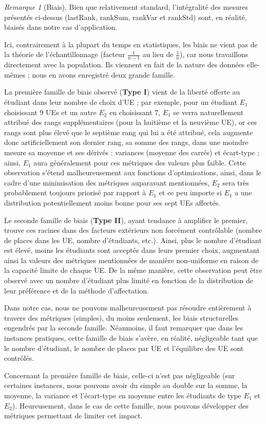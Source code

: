 \documentclass{rapport}
\theoremstyle{definition}
\theoremstyle{remark}
\theoremstyle{definition}
\theoremstyle{remark}
\newtheorem{remark}{Remarque}
\begin{document}
\begin{remark}[Biais]
    Bien que relativement standard, l'intégralité des mesures présentés ci-dessus (lastRank, rankSum, rankVar et rankStd) sont, en réalité, biaisés dans notre cas d'application.

    Ici, contrairement à la plupart du temps en statistiques, les biais ne vient pas de la théorie de l'échantillonnage (facteur $\frac{1}{n-1}$ au lieu de $\frac{1}{n}$), car nous travaillons directement avec la population. Ils viennent en fait de la nature des données elle-mêmes ; nous en avons enregistré deux grande famille.

    La première famille de biais observé (\textbf{Type I}) vient de la liberté offerte au étudiant dans leur nombre de choix d'UE ; par exemple, pour un étudiant $E_1$ choisissant 9 UEs et un autre $E_2$ en choisissant 7, $E_1$ se verra naturellement attribué des rangs supplémentaires (pour la huitième et la neuvième UE), or ces rangs sont plus élevé que le septième rang qui lui a été attribué, cela augmente donc artificiellement son dernier rang, sa somme des rangs, dans une moindre mesure sa moyenne et ses dérivés : variances (moyenne des carrés) et écart-type ; ainsi, $E_1$ aura généralement pour ces métriques des valeurs plus faible.
    Cette observation s'étend malheureusement aux fonctions d'optimisations, ainsi, dans le cadre d'une minimisation des métriques auparavant mentionnées, $E_2$ sera très probablement toujours priorisé par rapport à $E_1$ et ce peu importe si $E_1$ a une distribution potentiellement moins bonne pour ses sept UEs affectés.

    Le seconde famille de biais (\textbf{Type II}), ayant tendance à amplifier le premier, trouve ces racines dans des facteurs extérieurs non forcément contrôlable (nombre de places dans les UE, nombre d'étudiants, etc.). Ainsi, plus le nombre d'étudiant est élevé, moins les étudiants sont acceptés dans leurs premier choix, augmentant ainsi la valeurs des métriques mentionnées de manière non-uniforme en raison de la capacité limite de chaque UE. De la même manière, cette observation peut être observé avec un nombre d'étudiant plus limité en fonction de la distribution de leur préférence et de la méthode d'affectation.

    Dans notre cas, nous ne pouvons malheureusement pas résoudre entièrement à travers des métriques (simples), du moins seulement, les biais structurelles engendrés par la seconde famille. Néanmoins, il faut remarquer que dans les instances pratiques, cette famille de biais s'avère, en réalité, négligeable tant que le nombre d'étudiant, le nombre de places par UE et l'équilibre des UE sont contrôlés.

    Concernant la première famille de biais, celle-ci n'est pas négligeable (sur certaines instances, nous pouvons avoir du simple au double sur la somme, la moyenne, la variance et l'écart-type en moyenne entre les étudiants de type $E_1$ et $E_2$). Heureusement, dans le cas de cette famille, nous pouvons développer des métriques permettant de limiter cet impact.
\end{remark}
\end{document}
